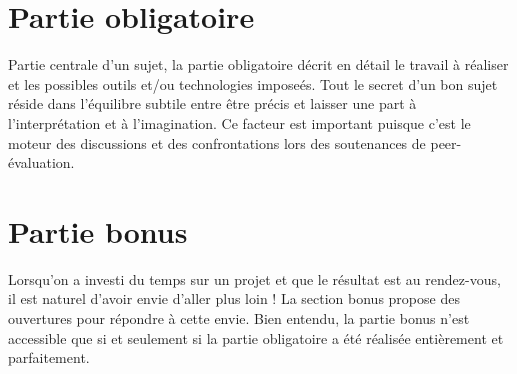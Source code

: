 \documentclass{42-fr}
\begin{document}
\chapter{Partie obligatoire}

    Partie centrale d'un sujet, la partie obligatoire d\'ecrit en
    d\'etail le travail \`a r\'ealiser et les possibles outils et/ou
    technologies impose\'es. Tout le secret d'un bon sujet
    r\'eside dans l'\'equilibre subtile entre \^etre pr\'ecis et
    laisser une part \`a l'interpr\'etation et \`a l'imagination. Ce
    facteur est important puisque c'est le moteur des discussions et
    des confrontations lors des soutenances de peer-\'evaluation.



\chapter{Partie bonus}

    Lorsqu'on a investi du temps sur un projet et que le r\'esultat
    est au rendez-vous, il est naturel d'avoir envie d'aller plus loin !
    La section bonus propose des ouvertures pour r\'epondre \`a
    cette envie. Bien entendu, la partie bonus n'est accessible que si
    et seulement si la partie obligatoire a \'et\'e r\'ealis\'ee
    enti\`erement et parfaitement.


\end{document}
